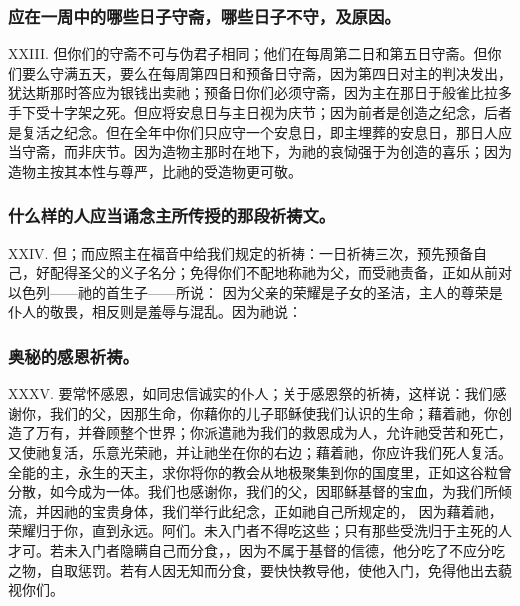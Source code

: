 
\subsubsection{应在一周中的哪些日子守斋，哪些日子不守，及原因。}

XXIII. 但你们的守斋不可与伪君子相同；他们在每周第二日和第五日守斋。但你们要么守满五天，要么在每周第四日和预备日守斋，因为第四日对主的判决发出，犹达斯那时答应为银钱出卖祂；预备日你们必须守斋，因为主在那日于般雀比拉多手下受十字架之死。但应将安息日与主日视为庆节；因为前者是创造之纪念，后者是复活之纪念。但在全年中你们只应守一个安息日，即主埋葬的安息日，那日人应当守斋，而非庆节。因为造物主那时在地下，为祂的哀恸强于为创造的喜乐；因为造物主按其本性与尊严，比祂的受造物更可敬。\par


\subsubsection{什么样的人应当诵念主所传授的那段祈祷文。}

XXIV. 但；而应照主在福音中给我们规定的祈祷：一日祈祷三次，预先预备自己，好配得圣父的义子名分；免得你们不配地称祂为父，而受祂责备，正如从前对以色列——祂的首生子——所说： 因为父亲的荣耀是子女的圣洁，主人的尊荣是仆人的敬畏，相反则是羞辱与混乱。因为祂说：\par


\subsubsection{奥秘的感恩祈祷。}

XXXV. 要常怀感恩，如同忠信诚实的仆人；关于感恩祭的祈祷，这样说：我们感谢你，我们的父，因那生命，你藉你的儿子耶稣使我们认识的生命；藉着祂，你创造了万有，并眷顾整个世界；你派遣祂为我们的救恩成为人，允许祂受苦和死亡，又使祂复活，乐意光荣祂，并让祂坐在你的右边；藉着祂，你应许我们死人复活。全能的主，永生的天主，求你将你的教会从地极聚集到你的国度里，正如这谷粒曾分散，如今成为一体。我们也感谢你，我们的父，因耶稣基督的宝血，为我们所倾流，并因祂的宝贵身体，我们举行此纪念，正如祂自己所规定的， 因为藉着祂，荣耀归于你，直到永远。阿们。未入门者不得吃这些；只有那些受洗归于主死的人才可。若未入门者隐瞒自己而分食，，因为不属于基督的信德，他分吃了不应分吃之物，自取惩罚。若有人因无知而分食，要快快教导他，使他入门，免得他出去藐视你们。\par

